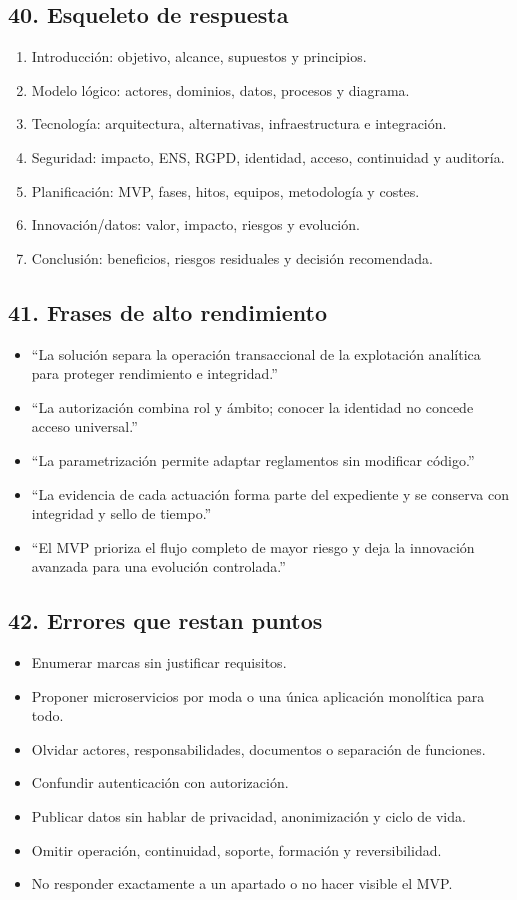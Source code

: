 \documentclass[11pt,a4paper]{article}
\begin{document}
\subsection{40. Esqueleto de respuesta}
\begin{enumerate}
\item Introducción: objetivo, alcance, supuestos y principios.
\item Modelo lógico: actores, dominios, datos, procesos y diagrama.
\item Tecnología: arquitectura, alternativas, infraestructura e integración.
\item Seguridad: impacto, ENS, RGPD, identidad, acceso, continuidad y auditoría.
\item Planificación: MVP, fases, hitos, equipos, metodología y costes.
\item Innovación/datos: valor, impacto, riesgos y evolución.
\item Conclusión: beneficios, riesgos residuales y decisión recomendada.
\end{enumerate}

\subsection{41. Frases de alto rendimiento}
\begin{itemize}
\item ``La solución separa la operación transaccional de la explotación analítica para proteger rendimiento e integridad.''
\item ``La autorización combina rol y ámbito; conocer la identidad no concede acceso universal.''
\item ``La parametrización permite adaptar reglamentos sin modificar código.''
\item ``La evidencia de cada actuación forma parte del expediente y se conserva con integridad y sello de tiempo.''
\item ``El MVP prioriza el flujo completo de mayor riesgo y deja la innovación avanzada para una evolución controlada.''
\end{itemize}

\subsection{42. Errores que restan puntos}
\begin{itemize}
\item Enumerar marcas sin justificar requisitos.
\item Proponer microservicios por moda o una única aplicación monolítica para todo.
\item Olvidar actores, responsabilidades, documentos o separación de funciones.
\item Confundir autenticación con autorización.
\item Publicar datos sin hablar de privacidad, anonimización y ciclo de vida.
\item Omitir operación, continuidad, soporte, formación y reversibilidad.
\item No responder exactamente a un apartado o no hacer visible el MVP.
\end{itemize}
\end{document}

